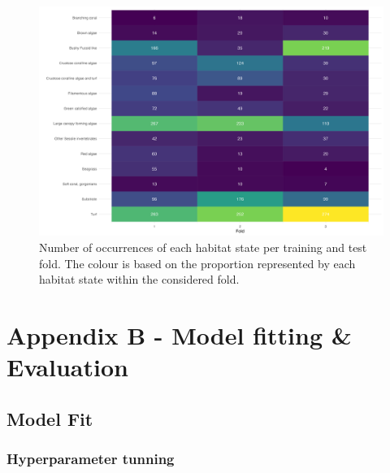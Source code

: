 \begin{figure}
\hypertarget{fig:chap3figS5}{%
\centering
\includegraphics{03-Chapitre3/figures/supplementary/06-occurence_habitat_folds.png}
\caption{Number of occurrences of each habitat state per training and
test fold. The colour is based on the proportion represented by each
habitat state within the considered fold.}\label{fig:chap3figS5}
}
\end{figure}

\clearpage

\hypertarget{appendixB-chapter3}{%
\section*{Appendix B - Model fitting \&
Evaluation}\label{appendixB-chapter3}}

\hypertarget{model-fit}{%
\subsection*{Model Fit}\label{model-fit}}

\hypertarget{hyperparameter-tunning}{%
\subsubsection*{Hyperparameter tunning}\label{hyperparameter-tunning}}

